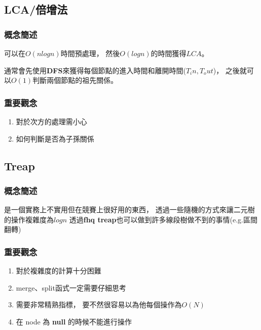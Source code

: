 \documentclass[12pt,oneside]{article}
\begin{document}
\subsection{LCA/倍增法}
\subsubsection*{概念簡述}

可以在$O(nlogn)$時間預處理，
然後$O(logn)$的時間獲得$LCA$。

通常會先使用\textbf{DFS}來獲得每個節點的進入時間和離開時間($T_in, T_out$)，
之後就可以$O(1)$判斷兩個節點的祖先關係。


\subsubsection*{重要觀念}
\begin{adjustwidth}{2em}{0em}
\begin{enumerate}
    \item 對於次方的處理需小心
    \item 如何判斷是否為子孫關係
\end{enumerate}
\end{adjustwidth}

\clearpage


\subsection{Treap}
\subsubsection*{概念簡述}
是一個實務上不實用但在競賽上很好用的東西，
透過一些隨機的方式來讓二元樹的操作複雜度為$log n$
透過\textbf{fhq treap}也可以做到許多線段樹做不到的事情(e.g.區間翻轉)

\subsubsection*{重要觀念}
\begin{adjustwidth}{2em}{0em}
\begin{enumerate}
    \item
        對於複雜度的計算十分困難
    \item
        merge、split函式一定需要仔細思考
    \item
        需要非常精熟指標，
        要不然很容易以為他每個操作為$O(N)$
    \item 
        在 node 為 \textbf{null} 的時候不能進行操作
\end{enumerate}
\end{adjustwidth}
\end{document}
